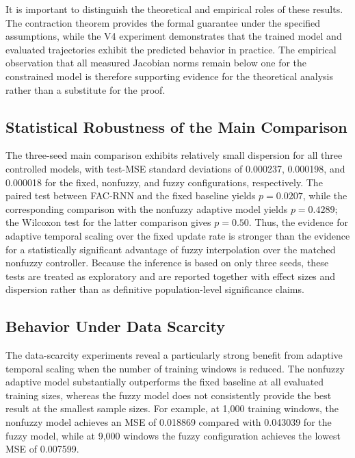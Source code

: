 \documentclass[journal]{IEEEtran}
\begin{document}
	It is important to distinguish the theoretical and empirical roles of these results. The contraction theorem provides the formal guarantee under the specified assumptions, while the V4 experiment demonstrates that the trained model and evaluated trajectories exhibit the predicted behavior in practice. The empirical observation that all measured Jacobian norms remain below one for the constrained model is therefore supporting evidence for the theoretical analysis rather than a substitute for the proof.
	
\subsection{Statistical Robustness of the Main Comparison}
\label{subsec:statistical_robustness}

The three-seed main comparison exhibits relatively small dispersion for all three controlled models, with test-MSE standard deviations of 0.000237, 0.000198, and 0.000018 for the fixed, nonfuzzy, and fuzzy configurations, respectively. The paired test between FAC-RNN and the fixed baseline yields $p=0.0207$, while the corresponding comparison with the nonfuzzy adaptive model yields $p=0.4289$; the Wilcoxon test for the latter comparison gives $p=0.50$. Thus, the evidence for adaptive temporal scaling over the fixed update rate is stronger than the evidence for a statistically significant advantage of fuzzy interpolation over the matched nonfuzzy controller. Because the inference is based on only three seeds, these tests are treated as exploratory and are reported together with effect sizes and dispersion rather than as definitive population-level significance claims.

\subsection{Behavior Under Data Scarcity}
\label{subsec:data_scarcity_discussion}

The data-scarcity experiments reveal a particularly strong benefit from adaptive temporal scaling when the number of training windows is reduced. The nonfuzzy adaptive model substantially outperforms the fixed baseline at all evaluated training sizes, whereas the fuzzy model does not consistently provide the best result at the smallest sample sizes. For example, at 1,000 training windows, the nonfuzzy model achieves an MSE of 0.018869 compared with 0.043039 for the fuzzy model, while at 9,000 windows the fuzzy configuration achieves the lowest MSE of 0.007599.
\end{document}
